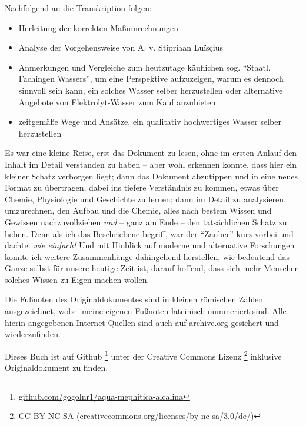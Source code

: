 \documentclass[a5paper,fontsize=10pt]{memoir}
\begin{document}
\setcounter{page}{1}

Nachfolgend an die Transkription folgen:
\begin{itemize}
\item Herleitung der korrekten Maßumrechnungen
\item Analyse der Vorgehensweise von A. v. Stipriaan Luïsçius
\item Anmerkungen und Vergleiche
zum heutzutage käuflichen sog. ``Staatl. Fachingen Wassers'',
um eine Perspektive aufzuzeigen,
warum es dennoch sinnvoll sein kann,
ein solches Wasser selber herzustellen oder
alternative Angebote von Elektrolyt-Wasser zum Kauf anzubieten
\item zeitgemäße Wege und Ansätze, ein qualitativ hochwertiges Wasser selber herzustellen
\end{itemize}

Es war eine kleine Reise,
erst das Dokument zu lesen,
ohne im ersten Anlauf den Inhalt im Detail verstanden zu haben --
aber wohl erkennen konnte,
dass hier ein kleiner Schatz verborgen liegt;
dann das Dokument abzutippen
und in eine neues Format zu übertragen,
dabei ins tiefere Verständnis zu kommen,
etwas über Chemie, Physiologie und Geschichte zu lernen;
dann im Detail zu analysieren, umzurechnen,
den Aufbau und die Chemie,
alles nach bestem Wissen und Gewissen nachzuvollziehen
\emph{und} -- ganz am Ende -- den tatsächlichen Schatz zu heben.
Denn als ich das Beschriebene begriff,
war der ``Zauber'' kurz vorbei
und dachte: \emph{wie einfach!}
Und mit Hinblick auf moderne und alternative Forschungen
konnte ich weitere Zusammenhänge dahingehend herstellen,
wie bedeutend das Ganze selbst für unsere heutige Zeit ist,
darauf hoffend, dass sich mehr Menschen
solches Wissen zu Eigen machen wollen.

Die Fußnoten des Originaldokumentes
sind in kleinen römischen Zahlen ausgezeichnet,
wobei meine eigenen Fußnoten lateinisch nummeriert sind.
Alle hierin angegebenen Internet-Quellen
sind auch auf archive.org gesichert und wiederzufinden. 

Dieses Buch ist auf Github%
\footnote{\href{https://github.com/gogolnr1/aqua-mephitica-alcalina}{github.com/gogolnr1/aqua-mephitica-alcalina}}
unter der Creative Commons Lizenz%
\footnote{CC BY-NC-SA (\href{https://creativecommons.org/licenses/by-nc-sa/3.0/de/}{creativecommons.org/licenses/by-nc-sa/3.0/de/})}
inklusive Originaldokument
zu finden.%
%
\checkoddpage\ifoddpage
  \newpage\strut
  \fi
\end{document}

